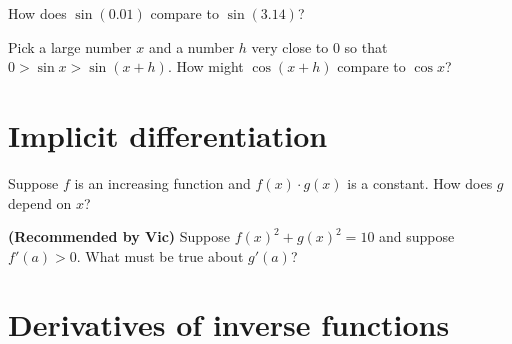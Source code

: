 \documentclass{ximera}
\newcommand{\recommendation}[1]{\textbf{(Recommended by #1)}}
\begin{document}
\begin{problem}
  How does $\sin(0.01)$ compare to $\sin(3.14)$?
  \begin{multipleChoice}
  \end{multipleChoice}
\end{problem}

\begin{problem}
  Pick a large number $x$ and a number $h$ very close to $0$ so that $0 > \sin x > \sin (x+h)$.  How might $\cos (x+h)$ compare to $\cos x$?
  \begin{multipleChoice}
  \end{multipleChoice}
\end{problem}

\clearpage

\section{Implicit differentiation}

\begin{problem}
  Suppose $f$ is an increasing function and $f(x) \cdot g(x)$ is a constant.  How does $g$ depend on $x$?
  \begin{multipleChoice}
  \end{multipleChoice}
\end{problem}

\begin{problem}
\recommendation{Vic}
  Suppose $f(x)^2 + g(x)^2 = 10$ and suppose $f'(a) > 0$.  What must be true about $g'(a)$?
  \begin{multipleChoice}
  \end{multipleChoice}
\end{problem}

\clearpage

\section{Derivatives of inverse functions}
\end{document}
